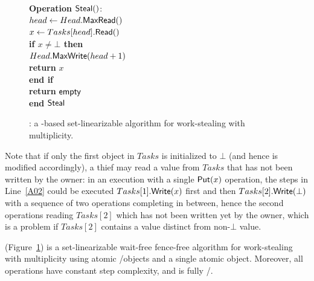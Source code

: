 \begin{figure}[ht]
{\begin{minipage}[t]{150mm}
\begin{tabbing}
        {\bf Operation} \({\sf \small Steal}()\): \\
         \> \> \(head \leftarrow Head.{\sf \small MaxRead}()\)\\
         \> \> \(x \leftarrow Tasks[head].{\sf \small Read}()\) \\
         \> \> {\bf if \(x \neq \bot\) then}\\
         \> \> \> \(Head.{\sf \small MaxWrite}(head+1)\)\\

         \> \> \> {\bf return} \(x\)\\
         \> \> {\bf end if}\\
         \> \> {\bf return} ${\sf \small empty}$\\
        {\bf end} ${\sf \small Steal}$

      \end{tabbing}
    \end{minipage}
  }
  \caption{\label{figure-max-reg-mult}\WFWSM: a \MaxReg-based
    set-linearizable algorithm for work-stealing with multiplicity.}
\end{figure}

Note that if only the first object in \(Tasks\) is initialized to \(\bot\) (and hence \Put is modified accordingly), a thief may read a value from \(Tasks\) that has not been written by the owner: in an execution with a single \({\sf \small Put}(x)\) operation, the steps in Line~\ref{A02} could be executed \(Tasks[1].{\sf \small Write}(x)\) first and then \(Tasks[2].{\sf \small Write}(\bot)\) with a sequence of two \Steal operations completing in between, hence the second operations reading $Tasks[2]$ which has not been written yet by the owner, which is a problem if \(Tasks[2]\) contains a value distinct from non-\(\bot\) value.


\begin{theorem}\label{theo-wf}
  \WFWSM (Figure~\ref{figure-max-reg-mult}) is a set-linearizable wait-free fence-free algorithm for work-stealing with multiplicity using atomic \R/\W objects and a single atomic \MaxReg object. Moreover, all operations have constant step complexity, and \Put is fully \R/\W.
\end{theorem}

